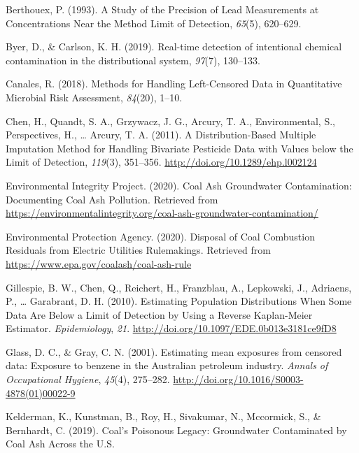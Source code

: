 \documentclass[12pt, twoside]{amherstthesis}
\newlength{\cslhangindent}
\newenvironment{cslreferences}%
  {\setlength{\parindent}{0pt}%
  \everypar{\setlength{\hangindent}{\cslhangindent}}\ignorespaces}%
  {\par}
\begin{document}
\hypertarget{refs}{}
\begin{cslreferences}
\leavevmode\hypertarget{ref-Berthouex1993}{}%
Berthouex, P. (1993). A Study of the Precision of Lead Measurements at Concentrations Near the Method Limit of Detection, \emph{65}(5), 620--629.

\leavevmode\hypertarget{ref-Byer2019}{}%
Byer, D., \& Carlson, K. H. (2019). Real-time detection of intentional chemical contamination in the distributional system, \emph{97}(7), 130--133.

\leavevmode\hypertarget{ref-Canales2018}{}%
Canales, R. (2018). Methods for Handling Left-Censored Data in Quantitative Microbial Risk Assessment, \emph{84}(20), 1--10.

\leavevmode\hypertarget{ref-Chen2011}{}%
Chen, H., Quandt, S. A., Grzywacz, J. G., Arcury, T. A., Environmental, S., Perspectives, H., \ldots{} Arcury, T. A. (2011). A Distribution-Based Multiple Imputation Method for Handling Bivariate Pesticide Data with Values below the Limit of Detection, \emph{119}(3), 351--356. \url{http://doi.org/10.1289/ehp.l002124}

\leavevmode\hypertarget{ref-EIP2020}{}%
Environmental Integrity Project. (2020). Coal Ash Groundwater Contamination: Documenting Coal Ash Pollution. Retrieved from \url{https://environmentalintegrity.org/coal-ash-groundwater-contamination/}

\leavevmode\hypertarget{ref-Car2020}{}%
Environmental Protection Agency. (2020). Disposal of Coal Combustion Residuals from Electric Utilities Rulemakings. Retrieved from \url{https://www.epa.gov/coalash/coal-ash-rule}

\leavevmode\hypertarget{ref-Gillespie2010}{}%
Gillespie, B. W., Chen, Q., Reichert, H., Franzblau, A., Lepkowski, J., Adriaens, P., \ldots{} Garabrant, D. H. (2010). Estimating Population Distributions When Some Data Are Below a Limit of Detection by Using a Reverse Kaplan-Meier Estimator. \emph{Epidemiology}, \emph{21}. \url{http://doi.org/10.1097/EDE.0b013e3181ce9fD8}

\leavevmode\hypertarget{ref-Glass2001}{}%
Glass, D. C., \& Gray, C. N. (2001). Estimating mean exposures from censored data: Exposure to benzene in the Australian petroleum industry. \emph{Annals of Occupational Hygiene}, \emph{45}(4), 275--282. \url{http://doi.org/10.1016/S0003-4878(01)00022-9}

\leavevmode\hypertarget{ref-Kelderman2019}{}%
Kelderman, K., Kunstman, B., Roy, H., Sivakumar, N., Mccormick, S., \& Bernhardt, C. (2019). Coal's Poisonous Legacy: Groundwater Contaminated by Coal Ash Across the U.S.


\end{cslreferences}
\end{document}
